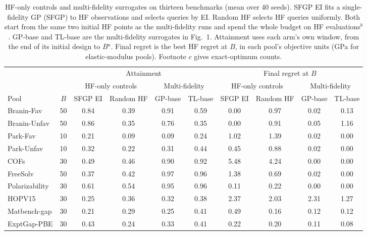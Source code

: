 \begin{table}[p]
\centering
\scriptsize
\caption{HF-only controls and multi-fidelity surrogates on thirteen benchmarks (mean over 40 seeds). SFGP EI fits a single-fidelity GP (SFGP) to HF observations and selects queries by EI. Random HF selects HF queries uniformly. Both start from the same two initial HF points as the multi-fidelity runs and spend the whole budget on HF evaluations$^{b}$. GP-base and TL-base are the multi-fidelity surrogates in Fig.~1. Attainment uses each arm's own window, from the end of its initial design to $B$$^{a}$. Final regret is the best HF regret at $B$, in each pool's objective units (GPa for elastic-modulus pools). Footnote $c$ gives exact-optimum counts.}
\label{supptab:hf_only_baselines}
\setlength{\tabcolsep}{3.2pt}%
\begin{tabular}{@{}lc cccc cccc@{}}
\toprule
& & \multicolumn{4}{c}{Attainment} & \multicolumn{4}{c}{Final regret at $B$} \\
\cmidrule(lr){3-6}\cmidrule(lr){7-10}
& & \multicolumn{2}{c}{HF-only controls} & \multicolumn{2}{c}{Multi-fidelity} & \multicolumn{2}{c}{HF-only controls} & \multicolumn{2}{c}{Multi-fidelity} \\
\cmidrule(lr){3-4}\cmidrule(lr){5-6}\cmidrule(lr){7-8}\cmidrule(lr){9-10}
Pool & $B$ & SFGP EI & Random HF & GP-base & TL-base & SFGP EI & Random HF & GP-base & TL-base \\
\midrule
Branin-Fav & 50 & 0.84 & 0.39 & 0.91 & 0.59 & 0.00 & 0.97 & 0.02 & 0.13 \\
Branin-Unfav & 50 & 0.86 & 0.35 & 0.76 & 0.35 & 0.00 & 0.91 & 0.05 & 1.16 \\
Park-Fav & 10 & 0.21 & 0.09 & 0.09 & 0.24 & 1.02 & 1.39 & 0.02 & 0.00 \\
Park-Unfav & 10 & 0.32 & 0.22 & 0.31 & 0.44 & 0.45 & 0.88 & 0.02 & 0.00 \\
COFs & 30 & 0.49 & 0.46 & 0.90 & 0.92 & 5.48 & 4.24 & 0.00 & 0.00 \\
FreeSolv & 50 & 0.37 & 0.42 & 0.97 & 0.96 & 1.38 & 0.69 & 0.02 & 0.00 \\
Polarizability & 30 & 0.61 & 0.54 & 0.95 & 0.96 & 0.11 & 0.22 & 0.00 & 0.00 \\
HOPV15 & 30 & 0.25 & 0.36 & 0.32 & 0.38 & 2.37 & 2.03 & 2.31 & 1.27 \\
Matbench-gap & 30 & 0.21 & 0.29 & 0.25 & 0.41 & 0.49 & 0.16 & 0.12 & 0.12 \\
ExptGap-PBE & 30 & 0.43 & 0.24 & 0.33 & 0.41 & 0.22 & 0.20 & 0.11 & 0.08 \\

\end{tabular}
\end{table}
